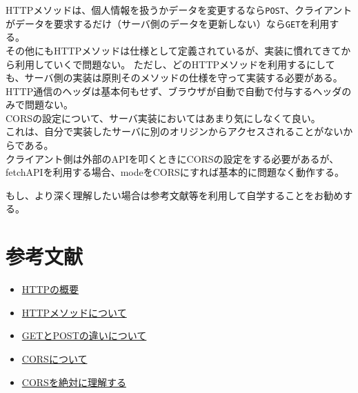 HTTPメソッドは、個人情報を扱うかデータを変更するなら\texttt{POST}、クライアントがデータを要求するだけ（サーバ側のデータを更新しない）なら\texttt{GET}を利用する。\\
その他にもHTTPメソッドは仕様として定義されているが、実装に慣れてきてから利用していくで問題ない。
ただし、どのHTTPメソッドを利用するにしても、サーバ側の実装は原則そのメソッドの仕様を守って実装する必要がある。\\
HTTP通信のヘッダは基本何もせず、ブラウザが自動で自動で付与するヘッダのみで問題ない。\\
CORSの設定について、サーバ実装においてはあまり気にしなくて良い。\\
これは、自分で実装したサーバに別のオリジンからアクセスされることがないからである。\\
クライアント側は外部のAPIを叩くときにCORSの設定をする必要があるが、fetchAPIを利用する場合、modeをCORSにすれば基本的に問題なく動作する。

もし、より深く理解したい場合は参考文献等を利用して自学することをお勧めする。

\section{参考文献}\label{ux53c2ux8003ux6587ux732e}

\begin{itemize}
\tightlist
\item
  \href{https://developer.mozilla.org/ja/docs/Web/HTTP/Overview}{HTTPの概要}
\item
  \href{https://developer.mozilla.org/ja/docs/Web/HTTP/Methods}{HTTPメソッドについて}
\item
  \href{https://qiita.com/kanataxa/items/522efb74421255f0e0a1}{GETとPOSTの違いについて}
\item
  \href{https://developer.mozilla.org/ja/docs/Web/HTTP/CORS}{CORSについて}
\item
  \href{https://zenn.dev/syo_yamamoto/articles/445ce152f05b02}{CORSを絶対に理解する}
\end{itemize}
